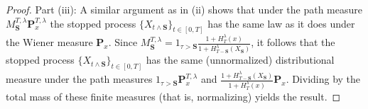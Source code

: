 \documentclass[10pt]{article}
\numberwithin{equation}{section}
\theoremstyle{definition}
\begin{document}
\begin{proof}
\noindent  Part (iii):   A similar argument as in (ii) shows that under the path measure $M_{\mathbf{S}}^{T,\lambda}\mathbf{P}_{x  }^{T,\lambda}  $ the stopped process $\{X_{t\wedge \mathbf{S}  }\}_{t\in [0,T]}$ has the same law as it does under the Wiener measure $\mathbf{P}_{x  }$. Since $M_{\mathbf{S}}^{T,\lambda}=1_{\tau >\mathbf{S} }\frac{1+ H^{\lambda}_{T}(x)  
}{ 1+ H^{\lambda}_{T-\mathbf{S}}(X_{\mathbf{S}})  }  $, it follows that the stopped process $\{X_{t\wedge \mathbf{S}  }\}_{t\in [0,T]}$ has the same (unnormalized) distributional measure under the path measures $1_{\tau >\mathbf{S} }\mathbf{P}_{x  }^{T,\lambda}  $ and $\frac{ 1+ H^{\lambda}_{T-\mathbf{S}}(X_{\mathbf{S}})  }{1+ H^{\lambda}_{T}(x) } \mathbf{P}_{x  }$. Dividing by the total mass of these finite measures (that is, normalizing)  yields the result.\vspace{.3cm}






\end{proof}
\end{document}
